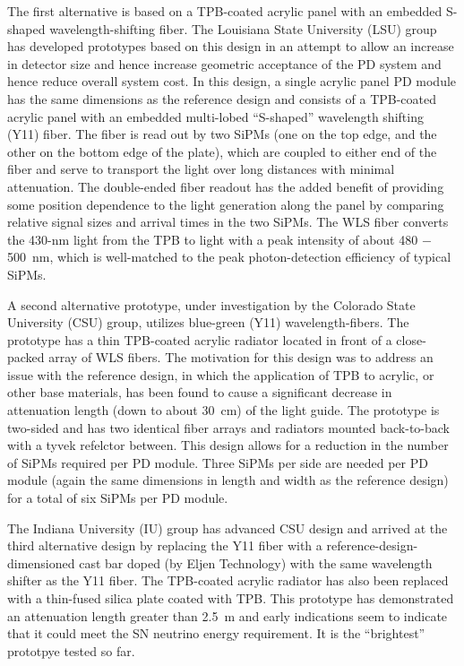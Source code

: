 The first alternative is based on a TPB-coated acrylic panel with an
embedded S-shaped wavelength-shifting fiber. The Louisiana State
University (LSU) group has developed prototypes based on this design
in an attempt to allow an increase in detector size and hence increase
geometric acceptance of the PD system and hence reduce overall system
cost.
%
In this design, a single acrylic panel PD module has the same
dimensions as the reference design and consists of a TPB-coated
acrylic panel with an embedded multi-lobed ``S-shaped'' wavelength
shifting (Y11) fiber. The fiber is read out by two SiPMs (one on the
top edge, and the other on the bottom edge of the plate), which are
coupled to either end of the fiber and serve to transport the light
over long distances with minimal attenuation. The double-ended fiber
readout has the added benefit of providing some position dependence to
the light generation along the panel by comparing relative signal
sizes and arrival times in the two SiPMs. The WLS fiber converts the
430-nm light from the TPB to light with a peak intensity of about 480
$-$ 500~nm, which is well-matched to the peak photon-detection
efficiency of typical SiPMs.

A second alternative prototype, under investigation by the Colorado
State University (CSU) group, utilizes blue-green (Y11)
wavelength-fibers. The prototype has a thin TPB-coated acrylic
radiator located in front of a close-packed array of WLS fibers. The
motivation for this design was to address an issue with the reference
design, in which the application of TPB to acrylic, or other base
materials, has been found to cause a significant decrease in
attenuation length (down to about 30~cm) of the light guide. The
prototype is two-sided and has two identical fiber arrays and
radiators mounted back-to-back with a tyvek refelctor between. This
design allows for a reduction in the number of SiPMs required per PD
module. Three SiPMs per side are needed per PD module (again the same
dimensions in length and width as the reference design) for a total of
six SiPMs per PD module.

The Indiana University (IU) group has advanced CSU design and arrived
at the third alternative design by replacing the Y11 fiber with a
reference-design-dimensioned cast bar doped (by Eljen Technology) with
the same wavelength shifter as the Y11 fiber. The TPB-coated acrylic
radiator has also been replaced with a thin-fused silica plate coated
with TPB. This prototype has demonstrated an attenuation length
greater than 2.5~m and early indications seem to indicate that it
could meet the SN neutrino energy requirement. It is the ``brightest''
prototpye tested so far.

